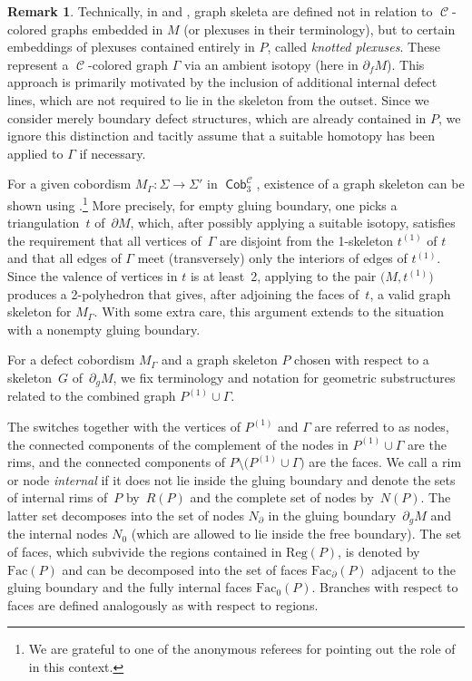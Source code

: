 \documentclass[10pt,a4paper]{amsart}
\DeclareMathOperator{\Cob}{\mathsf{Cob}}
\DeclareMathOperator{\calc}{\mathcal{C}}
\numberwithin{equation}{section}
\theoremstyle{definition}
\newtheorem{Remark}[Remark]{Remark}
\begin{document}
\begin{Remark}
 Technically, in \cite{F} and \cite{TV}, graph skeleta are defined not in relation to $\calc$-colored graphs embedded in $M$ (or plexuses in their terminology), but to certain embeddings of plexuses contained entirely in $P$, called \textit{knotted plexuses}. These represent a $\calc$-colored graph $\Gamma$ via an ambient isotopy (here in $\partial_f M$). This approach is primarily motivated by the inclusion of additional internal defect lines, which are not required to lie in the skeleton from the outset. Since we consider merely boundary defect structures, which are already contained in $P$, we ignore this distinction and tacitly assume that a suitable homotopy has been applied to $\Gamma$ if necessary.
\end{Remark}
For a given cobordism $M_{\Gamma} \colon \Sigma \to \Sigma'$ in $\Cob_3^{\calc}$, existence of a graph skeleton can be shown using
\cite[Theorem 11.5]{TV}.\footnote{We are grateful to one of the anonymous referees for pointing out
the role of \cite[Theorem 11.5]{TV} in this context.}
More precisely, for empty gluing boundary, one picks a triangulation~$t$ of~$\partial M$, which, after possibly applying a suitable isotopy, satisfies the requirement that all vertices of~$\Gamma$ are disjoint from the 1-skeleton $t^{(1)}$ of $t$ and that all edges of $\Gamma$ meet (transversely) only the interiors of edges of $t^{(1)}$. Since the valence of vertices in $t$ is at least~2, applying \cite[Theorem~11.5]{TV} to the pair $\bigl(M, t^{(1)}\bigr)$ produces a 2-polyhedron that gives, after adjoining the faces of~$t$, a valid graph skeleton for $M_{\Gamma}$. With some extra care, this argument extends to the situation with a nonempty gluing boundary.

For a defect cobordism $M_{\Gamma}$ and a graph skeleton $P$ chosen with respect to a skeleton~$G$ of~$\partial_gM$, we fix terminology and notation for geometric substructures related to the combined graph $P^{(1)} \cup \Gamma$.

The switches together with the vertices of $P^{(1)}$ and $\Gamma$ are referred to as nodes, the connected components of the complement of the nodes in $P^{(1)} \cup \Gamma$ are the rims, and the connected components of $P \setminus \bigl(P^{(1)} \cup \Gamma\bigr)$ are the faces. We call a rim or node \textit{internal} if it does not lie inside the gluing boundary and denote the sets of internal rims of~$P$ by~$R(P)$ and the complete set of nodes by~$N(P)$. The latter set decomposes into the set of nodes $N_{\partial}$ in the gluing boundary~$\partial_gM$ and the internal nodes $N_0$ (which are allowed to lie inside the free boundary). The set of faces, which subvivide the regions contained in $\mathrm{Reg}(P)$, is denoted by $\mathrm{Fac}(P)$ and can be decomposed into the set of faces $\mathrm{Fac}_{\partial}(P)$ adjacent to the gluing boundary and the fully internal faces $\mathrm{Fac}_0(P)$. Branches with respect to faces are defined analogously as with respect to regions.
\end{document}
